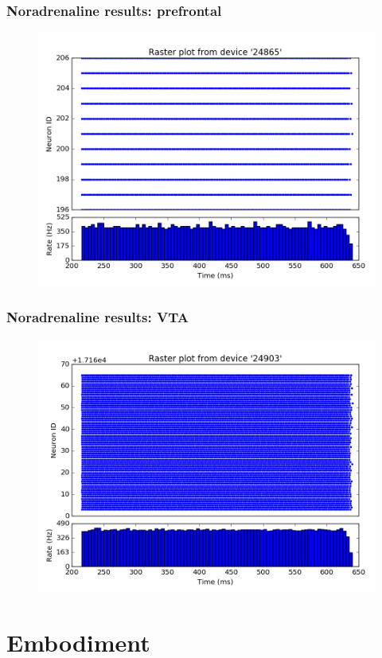 \documentclass[12pt, aspectratio=169]{beamer}
\begin{document}
\begin{frame}
\frametitle{Noradrenaline results: prefrontal}
\begin{figure}
\includegraphics[width=0.7\linewidth]{spikes_prefrontal}
\end{figure}
\end{frame}


\begin{frame}
\frametitle{Noradrenaline results: VTA}
\begin{figure}
\includegraphics[width=0.7\linewidth]{spikes_vta}
\end{figure}
\end{frame}

\section{Embodiment}
\end{document}
